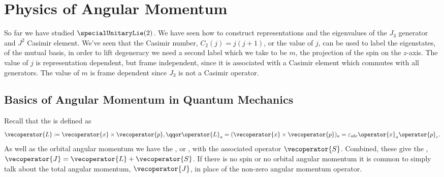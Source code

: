 \documentclass[fleqn]{NotesClass}
\begin{document}
    \chapter{Physics of Angular Momentum}
    So far we have studied \(\specialUnitaryLie(2)\).
    We have seen how to construct representations and the eigenvalues of the \(J_3\) generator and \(J^2\) Casimir element.
    We've seen that the Casimir number, \(C_2(j) = j(j + 1)\), or the value of \(j\), can be used to label the eigenstates, of the mutual basis, in order to lift degeneracy we need a second label which we take to be \(m\), the projection of the spin on the \(z\)-axis.
    The value of \(j\) is representation dependent, but frame independent, since it is associated with a Casimir element which commutes with all generators.
    The value of \(m\) is frame dependent since \(J_3\) is not a Casimir operator.
    
    \section{Basics of Angular Momentum in Quantum Mechanics}
    
    Recall that the  is defined as
    \begin{equation}
        \vecoperator{L} \coloneqq \vecoperator{x} \times \vecoperator{p}, \qqor \operator{L}_a = (\vecoperator{x} \times \vecoperator{p})_a = \varepsilon_{abc}\operator{x}_a\operator{p}_c.
    \end{equation}
    As well as the orbital angular momentum we have the , or , with the associated operator \(\vecoperator{S}\).
    Combined, these give the , \(\vecoperator{J} = \vecoperator{L} + \vecoperator{S}\).
    If there is no spin or no orbital angular momentum it is common to simply talk about the total angular momentum, \(\vecoperator{J}\), in place of the non-zero angular momentum operator.
    
\end{document}
